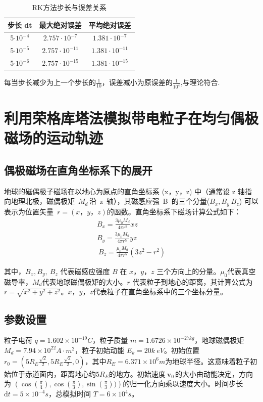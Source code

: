 \documentclass[11pt]{article}
\begin{document}
\begin{table}[h]
    \centering
    \begin{tabular}{|c|c|c|} \hline
        步长 dt &最大绝对误差  & 平均绝对误差\\ \hline
         5$\cdot 10^{-4}$& $2.757\cdot 10^{-7}$ & $1.381\cdot 10^{-7}$\\ \hline
         5$\cdot 10^{-5}$& $2.757\cdot 10^{-11}$ & $1.381\cdot 10^{-11}$\\ \hline
         5$\cdot 10^{-6}$& $2.757\cdot 10^{-15}$ & $1.381\cdot 10^{-15}$\\ \hline
    \end{tabular}
    \caption{RK方法步长与误差关系}
    \label{tab:my_label2}
\end{table}
每当步长减少为上一个步长的$\frac{1}{10}$，误差减小为原误差的$\frac{1}{10^4}$,与理论符合.
\section{利用荣格库塔法模拟带电粒子在均匀偶极磁场的运动轨迹}
\subsection{偶极磁场在直角坐标系下的展开}
地球的磁偶极子磁场在以地心为原点的直角坐标系 (x，y，z) 中（通常设 z 轴指向地理北极，磁偶极矩\ $M_{d\ }$沿\ z\ 轴），其磁感应强\ B\ 的三个分量($B_x,B_y{\ B}_z$) 可以表示为位置矢量\ $r=(x，y，z)的函数$。直角坐标系下磁场计算公式如下：
\begin{equation*}
    \begin{gathered}
        B_x=\frac{3μ_0M_d}{4πr^5}xz\\
        B_y=\frac{3μ_0M_d}{4πr^5}yz\\
        {\ B}_z=\frac{\mu_0M_d}{4\pi r^5}(3z^2-r^2)
    \end{gathered}
\end{equation*}



其中，$B_x, B_y, {\ B}_z$ 代表磁感应强度 $B$ 在 $x，y，z$ 三个方向上的分量。$\mu_0$代表真空磁导率，$M_d$代表地球磁偶极矩的大小。$r$ 代表粒子到地心的距离，其计算公式为$r=\sqrt{x^2+y^2+z^2}$。$x，y，z$代表粒子在直角坐标系中的三个坐标分量。

\subsection{参数设置}
粒子电荷 $q=1.602\times10^{-19}C$，粒子质量 $m=1.6726\times10^{-27kg}$，地球磁偶极矩$M_d=7.94\times10^{22}A⋅m^2$，粒子初始动能 $E_k=20k\ eV$。初始位置 $r_0=(5R_E\frac{\sqrt{2}}{2},5R_E\frac{\sqrt{2}}{2},0)$，其中$R_E=6.371\times{10}^6m$为地球半径。这意味着粒子初始位于赤道面内，距离地心约$5R_E$的地方。初始速度$\ \mathbf{v}_{0\ }$的大小由动能决定，方向为 $(\cos{(\frac{\pi}{4})},\cos{(\frac{\pi}{3})},\sin{(\frac{\pi}{3}))}) $的归一化方向乘以速度大小。时间步长 $\mathrm{d}t=5\times 10^{-4}s$，总模拟时间 $T=6\times{10}^4s$。
\end{document}
